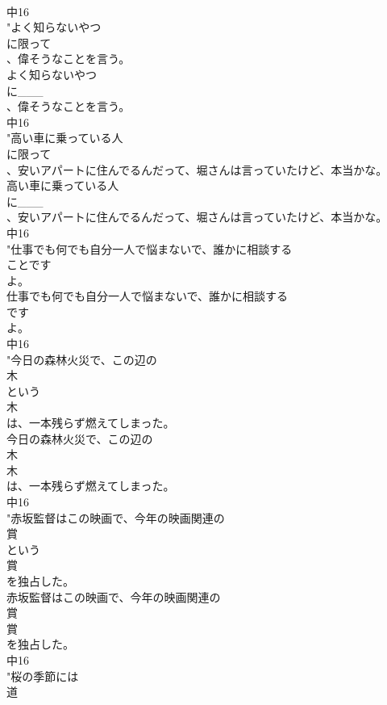 \documentclass[8pt]{extreport}
\begin{document}
\begin{CJK}{UTF8}{min}
\\	中16
\\	"よく知らないやつ
\\	に限って
\\	、偉そうなことを言う。
\\	よく知らないやつ
\\	に___
\\	、偉そうなことを言う。
\\	中16
\\	"高い車に乗っている人
\\	に限って
\\	、安いアパートに住んでるんだって、堀さんは言っていたけど、本当かな。
\\	高い車に乗っている人
\\	に___
\\	、安いアパートに住んでるんだって、堀さんは言っていたけど、本当かな。
\\	中16
\\	"仕事でも何でも自分一人で悩まないで、誰かに相談する
\\	ことです
\\	よ。
\\	仕事でも何でも自分一人で悩まないで、誰かに相談する
\\	です
\\	よ。
\\	中16
\\	"今日の森林火災で、この辺の
\\	木
\\	という
\\	木
\\	は、一本残らず燃えてしまった。
\\	今日の森林火災で、この辺の
\\	木
\\	木
\\	は、一本残らず燃えてしまった。
\\	中16
\\	"赤坂監督はこの映画で、今年の映画関連の
\\	賞
\\	という
\\	賞
\\	を独占した。
\\	赤坂監督はこの映画で、今年の映画関連の
\\	賞
\\	賞
\\	を独占した。
\\	中16
\\	"桜の季節には
\\	道

\end{CJK}
\end{document}
